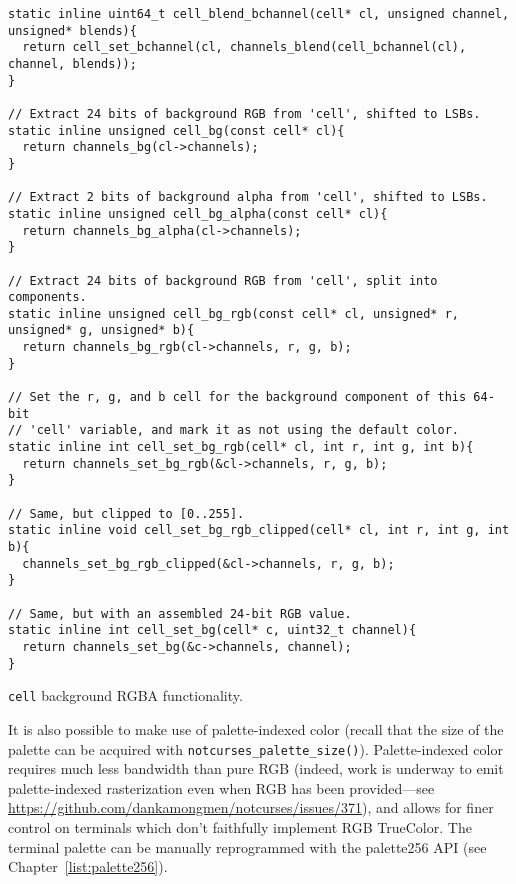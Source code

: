 \begin{listing}[!htbp]
\begin{verbatim}
static inline uint64_t cell_blend_bchannel(cell* cl, unsigned channel, unsigned* blends){
  return cell_set_bchannel(cl, channels_blend(cell_bchannel(cl), channel, blends));
}

// Extract 24 bits of background RGB from 'cell', shifted to LSBs.
static inline unsigned cell_bg(const cell* cl){
  return channels_bg(cl->channels);
}

// Extract 2 bits of background alpha from 'cell', shifted to LSBs.
static inline unsigned cell_bg_alpha(const cell* cl){
  return channels_bg_alpha(cl->channels);
}

// Extract 24 bits of background RGB from 'cell', split into components.
static inline unsigned cell_bg_rgb(const cell* cl, unsigned* r, unsigned* g, unsigned* b){
  return channels_bg_rgb(cl->channels, r, g, b);
}

// Set the r, g, and b cell for the background component of this 64-bit
// 'cell' variable, and mark it as not using the default color.
static inline int cell_set_bg_rgb(cell* cl, int r, int g, int b){
  return channels_set_bg_rgb(&cl->channels, r, g, b);
}

// Same, but clipped to [0..255].
static inline void cell_set_bg_rgb_clipped(cell* cl, int r, int g, int b){
  channels_set_bg_rgb_clipped(&cl->channels, r, g, b);
}

// Same, but with an assembled 24-bit RGB value.
static inline int cell_set_bg(cell* c, uint32_t channel){
  return channels_set_bg(&c->channels, channel);
}
\end{verbatim}
\caption{\texttt{cell} background RGBA functionality.}
\label{listing:cellrgbbg}
\end{listing}

It is also possible to make use of palette-indexed color (recall that the size
of the palette can be acquired with \texttt{notcurses\_palette\_size()}).
Palette-indexed color requires much less bandwidth than pure RGB (indeed, work
is underway to emit palette-indexed rasterization even when RGB has been
provided---see \url{https://github.com/dankamongmen/notcurses/issues/371}),
and allows for finer control on terminals which don't faithfully implement RGB
TrueColor. The terminal palette can be manually reprogrammed with the
palette256 API (see Chapter~\ref{list:palette256}).

